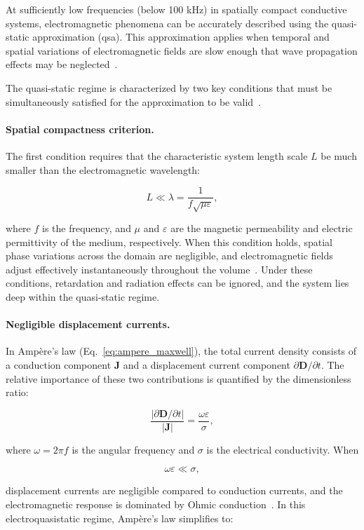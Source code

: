 At sufficiently low frequencies (below 100 kHz) in spatially compact conductive systems, electromagnetic phenomena can be accurately described using the quasi-static approximation (\gls{qsa}). This approximation applies when temporal and spatial variations of electromagnetic fields are slow enough that wave propagation effects may be neglected~\cite{plonsey-1967,haus-melcher-1989,jackson-1999}.

The quasi-static regime is characterized by two key conditions that must be simultaneously satisfied for the approximation to be valid~\cite{haus-melcher-1989}.

\paragraph*{Spatial compactness criterion.}
The first condition requires that the characteristic system length scale $L$ be much smaller than the electromagnetic wavelength:

\[
L \ll \lambda = \frac{1}{f\sqrt{\mu\varepsilon}},
\]

where $f$ is the frequency, and $\mu$ and $\varepsilon$ are the magnetic permeability and electric permittivity of the medium, respectively. When this condition holds, spatial phase variations across the domain are negligible, and electromagnetic fields adjust effectively instantaneously throughout the volume~\cite{haus-melcher-1989,jackson-1999}. Under these conditions, retardation and radiation effects can be ignored, and the system lies deep within the quasi-static regime.

\paragraph*{Negligible displacement currents.}
In Ampère's law (Eq.~\ref{eq:ampere_maxwell}), the total current density consists of a conduction component $\mathbf{J}$ and a displacement current component $\partial \mathbf{D}/\partial t$. The relative importance of these two contributions is quantified by the dimensionless ratio:

\[
\frac{|\partial \mathbf{D}/\partial t|}{|\mathbf{J}|} = \frac{\omega\varepsilon}{\sigma},
\]

where $\omega = 2\pi f$ is the angular frequency and $\sigma$ is the electrical conductivity. When

\[
\omega\varepsilon \ll \sigma,
\]

displacement currents are negligible compared to conduction currents, and the electromagnetic response is dominated by Ohmic conduction~\cite{plonsey-1967,haus-melcher-1989}. In this electroquasistatic regime, Ampère's law simplifies to:

